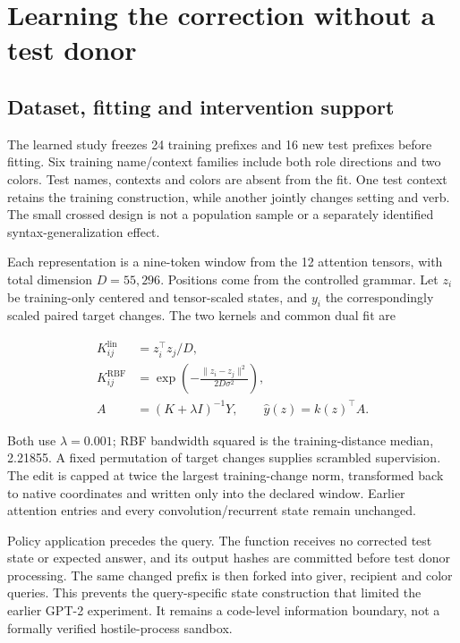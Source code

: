 \documentclass[11pt,letterpaper]{article}
\begin{document}
\section{Learning the correction without a test donor}

\subsection{Dataset, fitting and intervention support}

The learned study freezes 24 training prefixes and 16 new test prefixes before fitting. Six training name/context families include both role directions and two colors. Test names, contexts and colors are absent from the fit. One test context retains the training construction, while another jointly changes setting and verb. The small crossed design is not a population sample or a separately identified syntax-generalization effect.

Each representation is a nine-token window from the 12 attention tensors, with total dimension \(D=55{,}296\). Positions come from the controlled grammar. Let \(z_i\) be training-only centered and tensor-scaled states, and \(y_i\) the correspondingly scaled paired target changes. The two kernels and common dual fit are

\begin{equation}
\begin{aligned}
K^{\mathrm{lin}}_{ij}&=z_i^\top z_j/D,\\
K^{\mathrm{RBF}}_{ij}&=\exp\!\left(-\frac{\lVert z_i-z_j\rVert^2}{2D\sigma^2}\right),\\
A&=(K+\lambda I)^{-1}Y,\qquad \widehat y(z)=k(z)^\top A.
\end{aligned} \tag{9}
\end{equation}

Both use \(\lambda=0.001\); RBF bandwidth squared is the training-distance median, 2.21855. A fixed permutation of target changes supplies scrambled supervision. The edit is capped at twice the largest training-change norm, transformed back to native coordinates and written only into the declared window. Earlier attention entries and every convolution/recurrent state remain unchanged.

Policy application precedes the query. The function receives no corrected test state or expected answer, and its output hashes are committed before test donor processing. The same changed prefix is then forked into giver, recipient and color queries. This prevents the query-specific state construction that limited the earlier GPT-2 experiment. It remains a code-level information boundary, not a formally verified hostile-process sandbox.
\end{document}
